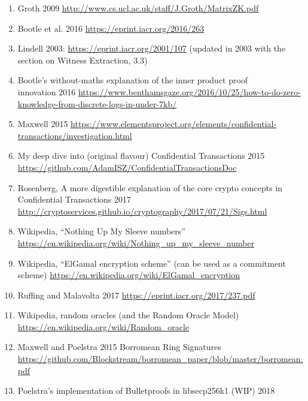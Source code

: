 \documentclass[10pt,a4paper]{article}
\providecommand{\tightlist}{%
  \setlength{\itemsep}{0pt}\setlength{\parskip}{0pt}}
\begin{document}
\begin{enumerate}
\def\labelenumi{\arabic{enumi}.}
\tightlist
\item
  \protect\hypertarget{anchor-7}{}{}Groth 2009
  \url{http://www.cs.ucl.ac.uk/staff/J.Groth/MatrixZK.pdf}
\item
  \protect\hypertarget{anchor-8}{}{}Bootle et al. 2016
  \url{https://eprint.iacr.org/2016/263}
\item
  Lindell 2003: \url{https://eprint.iacr.org/2001/107} (updated in 2003
  with the section on Witness Extraction, 3.3)
\item
  \protect\hypertarget{anchor-44}{}{}Bootle's without-maths explanation
  of the inner product proof \\ innovation 2016
  \url{https://www.benthamsgaze.org/2016/10/25/how-to-do-zero-knowledge-from-discrete-logs-in-under-7kb/}
\item
  \protect\hypertarget{anchor-2}{}{}Maxwell 2015
  \url{https://www.elementsproject.org/elements/confidential-transactions/investigation.html}
\item
  \protect\hypertarget{anchor-3}{}{}My deep dive into (original flavour)
  Confidential Transactions 2015
  \url{https://github.com/AdamISZ/ConfidentialTransactionsDoc}
\item
  \protect\hypertarget{anchor-4}{}{}Rosenberg, A more digestible
  explanation of the core crypto concepts in Confidential Transactions
  2017
  \url{http://cryptoservices.github.io/cryptography/2017/07/21/Sigs.html}
\item
  \protect\hypertarget{anchor-17}{}{}Wikipedia, ``Nothing Up My Sleeve
  numbers''
  \url{https://en.wikipedia.org/wiki/Nothing_up_my_sleeve_number}
\item
  \protect\hypertarget{anchor-20}{}{}Wikipedia, ``ElGamal encryption
  scheme'' (can be used as a commitment scheme)
  \url{https://en.wikipedia.org/wiki/ElGamal_encryption}
\item
  \protect\hypertarget{anchor-21}{}{}Ruffing and Malavolta 2017
  \url{https://eprint.iacr.org/2017/237.pdf}
\item
  Wikipedia, random oracles (and the Random Oracle Model)
  \url{https://en.wikipedia.org/wiki/Random_oracle}
\item
  \protect\hypertarget{anchor-62}{}{}Maxwell and Poelstra 2015 Borromean
  Ring Signatures
  \url{https://github.com/Blockstream/borromean_paper/blob/master/borromean.pdf}
\item
  \protect\hypertarget{anchor-71}{}{}Poelstra's implementation of
  Bulletproofs in libsecp256k1 (WIP) 2018

\end{enumerate}
\end{document}
